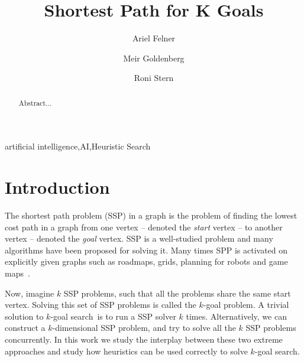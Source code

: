 \documentclass{aicom2e}
\newcommand{\kgs}{$k$-goal search}
\begin{document}
\begin{frontmatter}                           %
%
\title{Shortest Path for K Goals}
\maketitle
%
\author[]{Ariel Felner}
\address{Ben Gurion University of the Negev\\ Be'er Sheva, Israel\\
    E-mail: felner@bgu.ac.il}

\author[]{Meir Goldenberg}
\address{The Jerusalem College of Technology\\ Jerusalem, Israel\\
    E-mail: mgoldenbe@gmail.com}
\author[]{Roni Stern}
\address{Ben Gurion University of the Negev\\ Be'er Sheva, Israel\\
    E-mail: roni.stern@gmail.com}

\begin{abstract}
Abstract...

\end{abstract}

\begin{keyword}
artificial intelligence\sep AI\sep Heuristic Search
\end{keyword}
%
\end{frontmatter}

\section*{Introduction}


The shortest path problem (SSP) in a graph is the problem of finding the lowest cost path in a graph from one vertex -- denoted the {\em start} vertex -- to another vertex -- denoted the {\em goal} vertex.
SSP is a well-studied problem and many algorithms have been proposed for solving it.
Many times SPP is activated on explicitly given graphs such as roadmaps, grids, planning for robots and game maps~\cite{Ststurtevant2012benchmarks}. 

Now, imagine $k$ SSP problems, such that all the problems share the same start vertex.
Solving this set of SSP problems is called the $k$-goal problem.
A trivial solution to \kgs\ is to run a SSP solver $k$ times. Alternatively,
we can construct a $k$-dimensional SSP problem, and try to solve all the $k$ SSP problems concurrently.
In this work we study the interplay between these two extreme approaches and
study how heuristics can be used correctly to solve \kgs.
\end{document}
